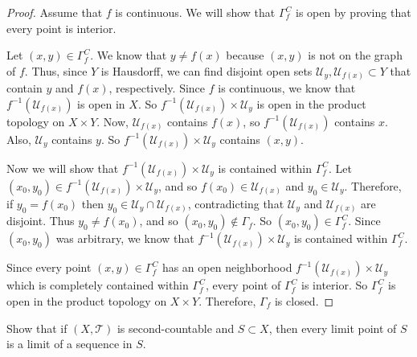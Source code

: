 \documentclass[12pt]{article}
\newcommand{\T}{\mathcal{T}}
\newcommand{\U}{\mathcal{U}}
\newenvironment{exercise}[2][Exercise]{\begin{trivlist}
\item[\hskip \labelsep {\bfseries #1}\hskip \labelsep {\bfseries #2.}]}{\end{trivlist}}
\begin{document}
\begin{proof}

Assume that $f$ is continuous.  We will show that $\Gamma_f^C$ is open by proving that every point is interior.

Let $(x,y) \in \Gamma_f^C$.  We know that $y \neq f(x)$ because $(x,y)$ is not on the graph of $f$.  Thus, since $Y$ is Hausdorff, we can find disjoint open sets $\U_y, \U_{f(x)} \subset Y$ that contain $y$ and $f(x)$, respectively.  Since $f$ is continuous, we know that $f^{-1}(\U_{f(x)})$ is open in $X$.  So $f^{-1}(\U_{f(x)}) \times \U_y$ is open in the product topology on $X \times Y$.  Now, $\U_{f(x)}$ contains $f(x)$, so $f^{-1}(\U_{f(x)})$ contains $x$.  Also, $\U_y$ contains $y$.  So $f^{-1}(\U_{f(x)}) \times \U_y$ contains $(x,y)$.

Now we will show that $f^{-1}(\U_{f(x)}) \times \U_y$ is contained within $\Gamma_f^C$.  Let $(x_0,y_0) \in f^{-1}(\U_{f(x)}) \times \U_y$, and so $f(x_0) \in \U_{f(x)}$ and $y_0 \in \U_y$.  Therefore, if $y_0 = f(x_0)$ then $y_0 \in \U_y \cap \U_{f(x)}$, contradicting that $\U_y$ and $\U_{f(x)}$ are disjoint.  Thus $y_0 \neq f(x_0)$, and so $(x_0,y_0) \not \in \Gamma_f$.  So $(x_0,y_0) \in \Gamma_f^C$.  Since $(x_0,y_0)$ was arbitrary, we know that $f^{-1}(\U_{f(x)}) \times \U_y$ is contained within $\Gamma_f^C$.

Since every point $(x,y) \in \Gamma_f^C$ has an open neighborhood $f^{-1}(\U_{f(x)}) \times \U_y$ which is completely contained within $\Gamma_f^C$, every point of $\Gamma_f^C$ is interior.  So $\Gamma_f^C$ is open in the product topology on $X \times Y$.  Therefore, $\Gamma_f$ is closed.
\end{proof}

\begin{exercise}{5}

Show that if $(X, \T )$ is second-countable and $S \subset X$, then every limit point of $S$ is a limit of a sequence in $S$.

\end{exercise}
\end{document}
